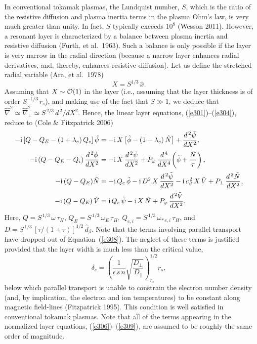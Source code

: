 \documentclass[notitlepage,12pt]{article}
\begin{document}
In conventional tokamak plasmas, the Lundquist number, $S$, which is the ratio of the resistive diffusion and plasma inertia terms in the plasma Ohm's law, is very much greater than unity. In fact, $S$ typically exceeds $10^8$ (Wesson 2011). However, a resonant layer is
characterized by a balance between plasma inertia and resistive diffusion (Furth, et al.\ 1963). Such a balance is
only possible if the layer is very narrow in the radial direction (because a narrow layer enhances radial derivatives, and, thereby, enhances
resistive diffusion). Let us define the stretched radial variable (Ara, et al.\ 1978)
\begin{equation}
X = S^{1/3}\,\hat{x}.
\end{equation}
Assuming that $X\sim{\cal O}(1)$ in the layer (i.e., assuming that the layer thickness is of order $S^{-1/3}\,r_s$),
and making use of the fact that $S\gg 1$, we deduce that $\hat{\nabla}^2\simeq \hat{\nabla}_\perp^2\simeq S^{\,2/3}\,d^{\,2}/dX^2$.
Hence, the linear layer equations, (\ref{e301})--(\ref{e304}), reduce to (Cole \& Fitzpatrick 2006)
\begin{align}\label{e306}
-{\rm i}\,[Q-Q_E-(1+\lambda_e)\,Q_{e}]\,\tilde{\psi}&= - {\rm i}\,X\left[\tilde{\phi}-(1+\lambda_e)\,\tilde{N}\right] + \frac{d^{\,2}\tilde{\psi}}{d X^2},\\[0.5ex]
-{\rm i}\,(Q-Q_E -Q_{i})\,\frac{d^{\,2}\tilde{\phi}}{dX^2}&= - {\rm i}\,X\,\frac{d^{\,2}\tilde{\psi}}{dX^2}+ P_\varphi\,\frac{d^{\,4}}{dX^4}\!\left(\tilde{\phi} + \frac{\tilde{N}}{\tau}\right),\\[0.5ex]
-{\rm i}\,(Q-Q_E)\tilde{N} &= - {\rm i}\,Q_{e}\,\tilde{\phi} - {\rm i} \,D^{2}\,X\,\frac{d^{\,2}\tilde{\psi}}{dX^{2}}
 - {\rm i}\,c_\beta^{\,2}\,X\,\tilde{V} + P_\perp\,\frac{d^{\,2} \tilde{N}}{dX^{2}},\label{e308}\\[0.5ex]
 -{\rm i}\,(Q-Q_E)\,\tilde{V} &= {\rm i}\,Q_{e}\,\tilde{\psi} - {\rm i}\,X\,\tilde{N} + P_\varphi\,\frac{d^{\,2}\tilde{V}}{dX^{2}}.\label{e309}
\end{align}
Here, $Q=S^{\,1/3}\,\omega\,\tau_H$, $Q_E = S^{\,1/3}\,\omega_E\,\tau_H$, $Q_{e,i} = S^{\,1/3}\,\omega_{\ast\,e,i}\,\tau_H$,
and $D = S^{\,1/3}\,[\tau/(1+\tau)]^{1/2}\,\hat{d}_\beta$. Note that the terms involving parallel transport have dropped out of
Equation~(\ref{e308}). The neglect of these terms is justified provided that the layer width is much less than the critical value,
\begin{equation}
\delta_c = \left(\frac{1}{\epsilon\,s\,n}\sqrt{\frac{D_\perp}{D_\parallel}}\right)^{1/2}_{r_s} r_s,
\end{equation}
below which parallel transport is unable to constrain the electron number density (and, by implication, the electron and
ion temperatures) to be constant along magnetic field-lines (Fitzpatrick 1995). This condition is well satisfied in conventional
tokamak plasmas. 
Note that all of the terms appearing in the 
normalized layer equations, (\ref{e306})--(\ref{e309}), are assumed to be roughly the same order of magnitude. 
\end{document}
